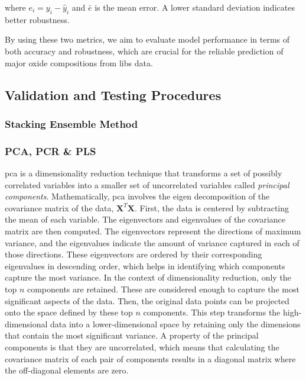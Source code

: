 where $e_i = y_i - \hat{y}_i$ and $\bar{e}$ is the mean error. A lower standard deviation indicates better robustness.

By using these two metrics, we aim to evaluate model performance in terms of both accuracy and robustness, which are crucial for the reliable prediction of major oxide compositions from \gls{libs} data.

\subsection{Validation and Testing Procedures}



\subsubsection{Stacking Ensemble Method}


\subsubsection{PCA, PCR \& PLS}
\gls{pca} is a dimensionality reduction technique that transforms a set of possibly correlated variables into a smaller set of uncorrelated variables called \textit{principal components}.
Mathematically, \gls{pca} involves the eigen decomposition of the covariance matrix of the data, $\mathbf{X}^T \mathbf{X}$.
First, the data is centered by subtracting the mean of each variable.
The eigenvectors and eigenvalues of the covariance matrix are then computed.
The eigenvectors represent the directions of maximum variance, and the eigenvalues indicate the amount of variance captured in each of those directions.
These eigenvectors are ordered by their corresponding eigenvalues in descending order, which helps in identifying which components capture the most variance.
In the context of dimensionality reduction, only the top $n$ components are retained.
These are considered enough to capture the most significant aspects of the data.
Then, the original data points can be projected onto the space defined by these top $n$ components.
This step transforms the high-dimensional data into a lower-dimensional space by retaining only the dimensions that contain the most significant variance.
A property of the principal components is that they are uncorrelated, which means that calculating the covariance matrix of each pair of components results in a diagonal matrix where the off-diagonal elements are zero.

